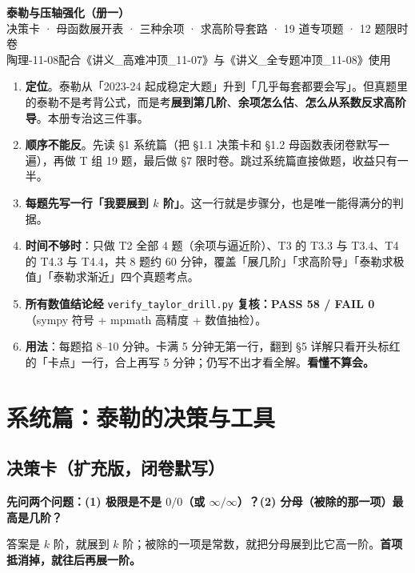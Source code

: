\documentclass[11pt,a4paper]{ctexart}
\begin{document}
\begin{center}
{\LARGE\bfseries 泰勒与压轴强化（册一）}\\[4pt]
{\large 决策卡 · 母函数展开表 · 三种余项 · 求高阶导套路 · 19 道专项题 · 12 题限时卷}\\[4pt]
{\small 陶理-11-08\quad 配合《讲义\_高难冲顶\_11-07》与《讲义\_全专题冲顶\_11-08》使用}
\end{center}

\begin{keypoint}[这本册子怎么用]
\begin{enumerate}
\item \textbf{定位}。泰勒从「2023-24 起成稳定大题」升到「几乎每套都要会写」。但真题里的泰勒不是考背公式，而是考\textbf{展到第几阶}、\textbf{余项怎么估}、\textbf{怎么从系数反求高阶导}。本册专治这三件事。
\item \textbf{顺序不能反}。先读 §1 系统篇（把 §1.1 决策卡和 §1.2 母函数表闭卷默写一遍），再做 T 组 19 题，最后做 §7 限时卷。跳过系统篇直接做题，收益只有一半。
\item \textbf{每题先写一行「我要展到 $k$ 阶」}。这一行就是步骤分，也是唯一能得满分的判据。
\item \textbf{时间不够时}：只做 T2 全部 4 题（余项与逼近阶）、T3 的 T3.3 与 T3.4、T4 的 T4.3 与 T4.4，共 8 题约 60 分钟，覆盖「展几阶」「求高阶导」「泰勒求极值」「泰勒求渐近」四个真题考点。
\item \textbf{所有数值结论经} \texttt{verify\_taylor\_drill.py} \textbf{复核：PASS 58 / FAIL 0}（sympy 符号 + mpmath 高精度 + 数值抽检）。
\item \textbf{用法}：每题掐 8--10 分钟。卡满 5 分钟无第一行，翻到 §5 详解只看开头标红的「卡点」一行，合上再写 5 分钟；仍写不出才看全解。\textbf{看懂不算会。}
\end{enumerate}
\end{keypoint}

\section{系统篇：泰勒的决策与工具}

\subsection{决策卡（扩充版，闭卷默写）}

\begin{methodbox}[一句话总纲]
\textbf{先问两个问题：(1) 极限是不是 $0/0$（或 $\infty/\infty$）？(2) 分母（被除的那一项）最高是几阶？}

答案是 $k$ 阶，就展到 $k$ 阶；被除的一项是常数，就把分母展到比它高一阶。\textbf{首项抵消掉，就往后再展一阶。}
\end{methodbox}
\end{document}
